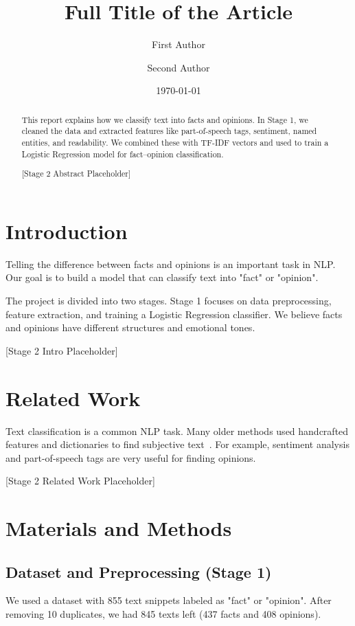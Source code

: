 \documentclass[12pt,a4paper,twocolumn]{article}
\title{Full Title of the Article} %
\author[1]{First Author} %
\author[2]{Second Author}
\affil[1]{Graz University of Technology, Graz, Austria}
\affil[2]{University of Graz, Graz, Austria}
\date{\today}
\begin{document}
\maketitle

\begin{abstract}
    This report explains how we classify text into facts and opinions. In Stage 1, we cleaned the data and extracted features like part-of-speech tags, sentiment, named entities, and readability. We combined these with TF-IDF vectors and used to train a Logistic Regression model for fact–opinion classification.

    [Stage 2 Abstract Placeholder]
\end{abstract}

\section{Introduction}
\label{sec:intro}
Telling the difference between facts and opinions is an important task in NLP. Our goal is to build a model that can classify text into "fact" or "opinion". 

The project is divided into two stages. Stage 1 focuses on data preprocessing, feature extraction, and training a Logistic Regression classifier. We believe facts and opinions have different structures and emotional tones.

[Stage 2 Intro Placeholder]


\section{Related Work}
Text classification is a common NLP task. Many older methods used handcrafted features and dictionaries to find subjective text~\citep{vaswani2017attention}. For example, sentiment analysis and part-of-speech tags are very useful for finding opinions.

[Stage 2 Related Work Placeholder]

\section{Materials and Methods}
\label{sec:methods}
\subsection{Dataset and Preprocessing (Stage 1)}
We used a dataset with 855 text snippets labeled as "fact" or "opinion". After removing 10 duplicates, we had 845 texts left (437 facts and 408 opinions).
\end{document}
